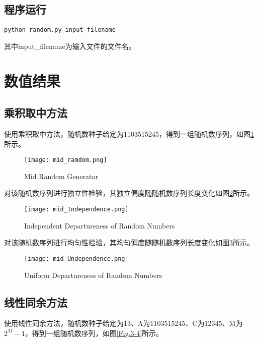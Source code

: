 \documentclass[a4paper,12pt]{ctexart}
\begin{document}
\subsection{程序运行}
\begin{lstlisting}[title=程序运行指令,frame=shadowbox]
python random.py input_filename
\end{lstlisting}
其中input\_filename为输入文件的文件名。

\section{数值结果}
\subsection{乘积取中方法}
使用乘积取中方法，随机数种子给定为1103515245，得到一组随机数序列，如图\ref{Fig.3-1}所示。

\begin{figure}[ht] %
\centering %
\texttt{[image: mid\_ramdom.png]} %
\caption{Mid Random Generator} %
\label{Fig.3-1} %
\end{figure}

对该随机数序列进行独立性检验，其独立偏度随随机数序列长度变化如图\ref{Fig.3-2}所示。

\begin{figure}[hb] %
\centering %
\texttt{[image: mid\_Independence.png]} %
\caption{Independent Departureness of Random Numbers} %
\label{Fig.3-2} %
\end{figure}

对该随机数序列进行均匀性检验，其均匀偏度随随机数序列长度变化如图\ref{Fig.3-3}所示。

\begin{figure}[ht] %
\centering %
\texttt{[image: mid\_Undependence.png]} %
\caption{Uniform Departureness of Random Numbers} %
\label{Fig.3-3} %
\end{figure}

\subsection{线性同余方法}
使用线性同余方法，随机数种子给定为13、A为1103515245、C为12345、M为$2^{31}-1$，得到一组随机数序列，如图\ref{Fig.3-4}所示。
\end{document}
